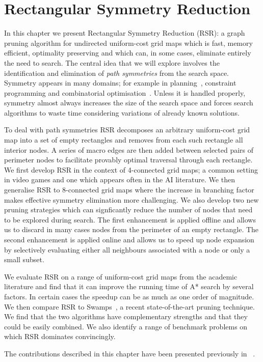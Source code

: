 \chapter{Rectangular Symmetry Reduction}
\label{cha:rsr} In this chapter we present Rectangular Symmetry Reduction (RSR): a graph pruning
algorithm for undirected uniform-cost grid maps which is fast, memory efficient,
optimality preserving and which can, in some cases, eliminate entirely the need
to search.  The central idea that we will explore involves the identification
and elimination of \emph{path symmetries} from the search space. 
Symmetry appears in many domains; for example in planning~\citep{fox99}, constraint 
programming \citep{walsh07} and combinatorial optimisation~\citep{fukunaga08}. 
Unless it is handled properly, symmetry almost always 
increases the size of the search space and forces search algorithms to waste time
considering variations of already known solutions.
\par
To deal with path symmetries RSR decomposes an arbitrary uniform-cost grid map
into a set of empty rectangles and removes from each such
rectangle all interior nodes.  A
series of macro edges are then added between selected pairs of perimeter nodes
to facilitate provably optimal traversal through each rectangle.  
We first develop RSR in the context of 4-connected grid maps; a common
setting in video games and one which appears often in the AI literature.
We then generalise RSR to 8-connected grid maps where the increase in
branching factor makes effective symmetry elimination more challenging. 
We also develop two new pruning strategies which can signficantly
reduce the number of nodes that need to be explored during search. 
The first enhancement is applied offline and allows us to discard in many cases 
nodes from the perimeter of an empty rectangle. The second enhancement is
applied online and allows us to speed up node expansion by selectively
evaluating either all neighbours associated with a node or only a small subset.

We evaluate RSR on a range of uniform-cost grid maps from the academic literature and find
that it can improve the running time of A* search by several factors. In certain cases the
speedup can be as much as one order of magnitude. We then compare RSR to 
Swamps~\citep{pochter10}, a recent state-of-the-art
pruning technique. We find that the two algorithms have complementary strengths and that they
could be easily combined. We also identify a range of benchmark problems on which RSR 
dominates convincingly.  
\par

The contributions described in this chapter have been presented previously in
~\citep{harabor10,harabor11a,harabor11c}.

